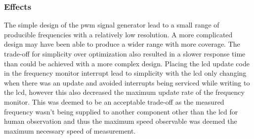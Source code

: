 \subsubsection{Effects}
The simple design of the \gls{pwm} signal generator lead to a small
range of producible frequencies with a relatively low resolution. A more
complicated design may have been able to produce a wider range with more
coverage. The trade-off for simplicity over optimization also resulted
in a slower response time than could be achieved with a more complex
design. Placing the \gls{lcd} update code in the frequency monitor
interrupt lead to simplicity with the \gls{lcd} only changing when there
was an update and avoided interrupts being serviced while writing to the
\gls{lcd}, however this also decreased the maximum update rate of the
frequency monitor. This was deemed to be an acceptable trade-off as the
measured frequency wasn't being supplied to another component other than
the \gls{lcd} for human observation and thus the maximum speed
observable was deemed the maximum necessary speed of measurement.
